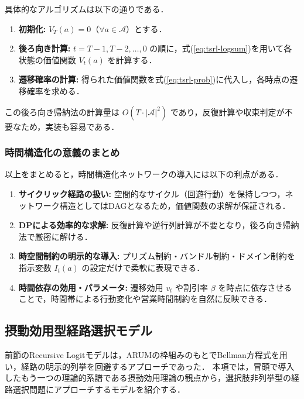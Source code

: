 具体的なアルゴリズムは以下の通りである．
\begin{enumerate}
  \item \textbf{初期化:} $V_T(a) = 0$（$\forall a \in \mathcal{A}$）とする．
  \item \textbf{後ろ向き計算:} $t = T-1, T-2, \ldots, 0$ の順に，式(\ref{eq:tsrl-logsum})を用いて各状態の価値関数 $V_t(a)$ を計算する．
  \item \textbf{遷移確率の計算:} 得られた価値関数を式(\ref{eq:tsrl-prob})に代入し，各時点の遷移確率を求める．
\end{enumerate}
この後ろ向き帰納法の計算量は $O(T \cdot |\mathcal{A}|^2)$ であり，反復計算や収束判定が不要なため，実装も容易である．

\subsubsection{時間構造化の意義のまとめ}
以上をまとめると，時間構造化ネットワークの導入には以下の利点がある．
\begin{enumerate}
  \item \textbf{サイクリック経路の扱い:} 空間的なサイクル（回遊行動）を保持しつつ，ネットワーク構造としてはDAGとなるため，価値関数の求解が保証される．
  \item \textbf{DPによる効率的な求解:} 反復計算や逆行列計算が不要となり，後ろ向き帰納法で厳密に解ける．
  \item \textbf{時空間制約の明示的な導入:} プリズム制約・バンドル制約・ドメイン制約を指示変数 $I_t(a)$ の設定だけで柔軟に表現できる．
  \item \textbf{時間依存の効用・パラメータ:} 遷移効用 $v_t$ や割引率 $\beta$ を時点に依存させることで，時間帯による行動変化や営業時間制約を自然に反映できる．
\end{enumerate}


\subsection{摂動効用型経路選択モデル}\label{ssec:purc}
前節のRecursive Logitモデルは，ARUMの枠組みのもとでBellman方程式を用い，経路の明示的列挙を回避するアプローチであった．
本項では，冒頭で導入したもう一つの理論的系譜である摂動効用理論の観点から，選択肢非列挙型の経路選択問題にアプローチするモデルを紹介する．

